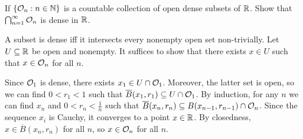 \begin{problem}
If $\left\{ \mathcal{O}_n : n \in \mathbb{N}\right\}$ is a countable collection of open dense subsets of $\mathbb{R}$. Show that $\bigcap_{n=1}^\infty \mathcal{O}_n$ is dense in $\mathbb{R}$.
\begin{solution}
A subset is dense iff it intersects every nonempty open set non-trivially. Let $U \subseteq \mathbb{R}$ be open and nonempty. It suffices to show that there exists $x \in U$ such that $x \in \mathcal{O}_n$ for all $n$.

Since $\mathcal{O}_1$ is dense, there exists $x_1 \in U \cap \mathcal{O}_1$. Moreover, the latter set is open, so we can find $0 < r_1 < 1$ such that $\overline{B}(x_1, r_1) \subseteq U \cap \mathcal{O}_1$. By induction, for any $n$ we can find $x_n$ and $0 < r_n < \frac{1}{n}$ such that $\overline{B}(x_n, r_n) \subseteq B(x_{n-1}, r_{n-1}) \cap \mathcal{O}_n$. Since the sequence $x_i$ is Cauchy, it converges to a point $x \in \mathbb{R}$. By closedness, $x \in \overline{B}(x_n, r_n)$ for all $n$, so $x \in \mathcal{O}_n$ for all $n$.
\end{solution}
\end{problem}

